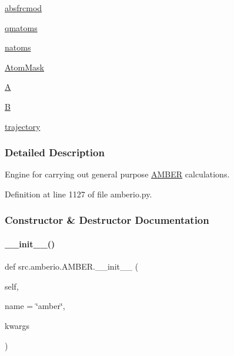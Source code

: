 \begin{DoxyCompactItemize}
\item 
\hyperlink{classsrc_1_1amberio_1_1AMBER_acc5d83dd7827792a36daa13af036b38a}{absfrcmod}
\item 
\hyperlink{classsrc_1_1amberio_1_1AMBER_a9959c435e77f19b16ddda113fd5b19a5}{qmatoms}
\item 
\hyperlink{classsrc_1_1amberio_1_1AMBER_aafd7c68a0df54ff8bfe015282794a7cb}{natoms}
\item 
\hyperlink{classsrc_1_1amberio_1_1AMBER_a6297c9429e3c41164676bcf829c5bfb1}{Atom\+Mask}
\item 
\hyperlink{classsrc_1_1amberio_1_1AMBER_aeacbed02cfd157b9afd05d39a5939863}{A}
\item 
\hyperlink{classsrc_1_1amberio_1_1AMBER_a1f880bacfdb1dc940daa486ee854e476}{B}
\item 
\hyperlink{classsrc_1_1amberio_1_1AMBER_a5296863cab305fa3adc68de60fa593b7}{trajectory}
\end{DoxyCompactItemize}


\subsubsection{Detailed Description}
Engine for carrying out general purpose \hyperlink{classsrc_1_1amberio_1_1AMBER}{A\+M\+B\+ER} calculations. 



Definition at line 1127 of file amberio.\+py.



\subsubsection{Constructor \& Destructor Documentation}
\mbox{\label{classsrc_1_1amberio_1_1AMBER_a4f65d618112f743df7dcba8fe71d9945}} 
\paragraph{\texorpdfstring{\+\_\+\+\_\+init\+\_\+\+\_\+()}{\_\_init\_\_()}}
{\footnotesize\ttfamily def src.\+amberio.\+A\+M\+B\+E\+R.\+\_\+\+\_\+init\+\_\+\+\_\+ (\begin{DoxyParamCaption}\item[{}]{self,  }\item[{}]{name = {\ttfamily \char`\"{}amber\char`\"{}},  }\item[{}]{kwargs }\end{DoxyParamCaption})}



